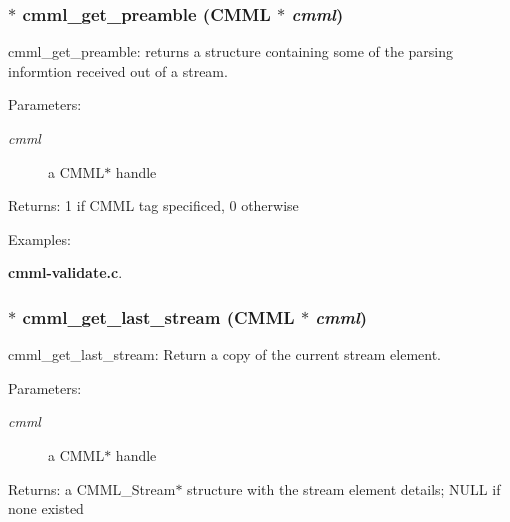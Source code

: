 \subsubsection{$\ast$ cmml\_\-get\_\-preamble ({\bf CMML} $\ast$ {\em cmml})}\label{cmml_8h_a44}


cmml\_\-get\_\-preamble: returns a structure containing some of the parsing informtion received out of a stream.

\begin{Desc}
\item[Parameters:]
\begin{description}
\item[{\em cmml}]a CMML$\ast$ handle\end{description}
\end{Desc}
\begin{Desc}
\item[Returns:]1 if CMML tag specificed, 0 otherwise \end{Desc}
\begin{Desc}
\item[Examples: ]\par
{\bf cmml-validate.c}.\end{Desc}
\subsubsection{$\ast$ cmml\_\-get\_\-last\_\-stream ({\bf CMML} $\ast$ {\em cmml})}\label{cmml_8h_a45}


cmml\_\-get\_\-last\_\-stream: Return a copy of the current stream element.

\begin{Desc}
\item[Parameters:]
\begin{description}
\item[{\em cmml}]a CMML$\ast$ handle\end{description}
\end{Desc}
\begin{Desc}
\item[Returns:]a CMML\_\-Stream$\ast$ structure with the stream element details; NULL if none existed \end{Desc}
